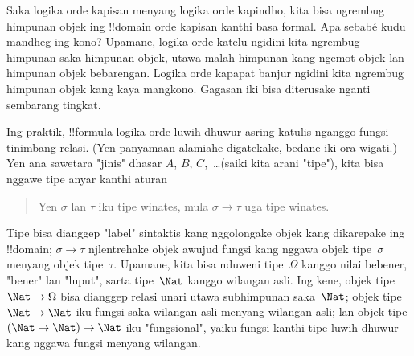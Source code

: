 \documentclass[../../../include/open-logic-section]{subfiles}
\begin{document}


Saka logika orde kapisan menyang logika orde kapindho,
kita bisa ngrembug himpunan objek ing !!{domain}
orde kapisan kanthi basa formal. Apa sebabé kudu
mandheg ing kono? Upamane, logika orde katelu
ngidini kita ngrembug himpunan saka himpunan objek,
utawa malah himpunan kang ngemot objek lan himpunan
objek bebarengan. Logika orde kapapat banjur
ngidini kita ngrembug himpunan objek kang kaya
mangkono. Gagasan iki bisa diterusake nganti
sembarang tingkat.

Ing praktik, !!{formula} logika orde luwih dhuwur
asring katulis nganggo fungsi tinimbang relasi.
(Yen panyamaan alamiahe digatekake, bedane iki
ora wigati.) Yen ana sawetara "jinis" dhasar
$A$, $B$, $C$,~\dots (saiki kita arani "tipe"),
kita bisa nggawe tipe anyar kanthi aturan
\begin{quote}
Yen $\sigma$ lan $\tau$ iku tipe winates, mula
$\sigma \to \tau$ uga tipe winates.
\end{quote}
Tipe bisa dianggep "label" sintaktis kang
nggolongake objek kang dikarepake ing !!{domain};
$\sigma \to \tau$ njlentrehake objek awujud
fungsi kang nggawa objek tipe~$\sigma$ menyang
objek tipe~$\tau$. Upamane, kita bisa nduweni
tipe~$\Omega$ kanggo nilai bebener, "bener" lan
"luput", sarta tipe~$\Nat$ kanggo wilangan asli.
Ing kene, objek tipe $\Nat \to \Omega$ bisa
dianggep relasi unari utawa subhimpunan
saka~$\Nat$; objek tipe $\Nat \to \Nat$ iku
fungsi saka wilangan asli menyang wilangan asli;
lan objek tipe $(\Nat \to \Nat) \to \Nat$
iku "fungsional", yaiku fungsi kanthi tipe
luwih dhuwur kang nggawa fungsi menyang wilangan.
\end{document}
